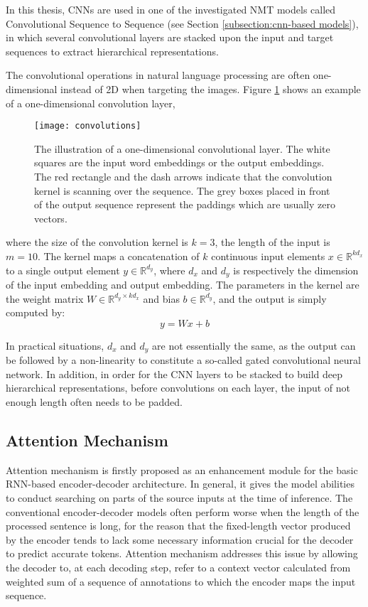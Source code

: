 In this thesis, CNNs are used in one of the investigated NMT models called Convolutional Sequence to Sequence (see Section \ref{subsection:cnn-based models}), in which several convolutional layers are stacked upon the input and target sequences to extract hierarchical representations.

The convolutional operations in natural language processing are often one-dimensional instead of 2D when targeting the images. Figure \ref{figure:convolutions} shows an example of a one-dimensional convolution layer, 
\begin{figure}[h]
\texttt{[image: convolutions]}
\centering
\caption{The illustration of a one-dimensional convolutional layer. The white squares are the input word embeddings or the output embeddings. The red rectangle and the dash arrows indicate that the convolution kernel is scanning over the sequence. The grey boxes placed in front of the output sequence represent the paddings which are usually zero vectors.}
\label{figure:convolutions}
\end{figure}
where the size of the convolution kernel is $ k=3 $, the length of the input is $ m=10 $. The kernel maps a concatenation of $ k $ continuous input elements $ x\in \mathbb{R}^{kd_{x}} $ to a single output element $ y \in \mathbb{R}^{d_{y}} $, where $ d_{x} $ and $ d_{y} $ is respectively the dimension of the input embedding and output embedding. The parameters in the kernel are the weight matrix $ W \in \mathbb{R}^{d_{y} \times kd_{x}} $ and bias $ b \in \mathbb{R}^{d_{y}} $, and the output is simply computed by:
\[ y = Wx + b \]

In practical situations, $ d_{x} $ and $ d_{y} $ are not essentially the same, as the output can be followed by a non-linearity to constitute a so-called gated convolutional neural network. In addition, in order for the CNN layers to be stacked to build deep hierarchical representations, before convolutions on each layer, the input of not enough length often needs to be padded.

\subsection{Attention Mechanism} \label{subsection:attention}

Attention mechanism \cite{Bahdanau2014} is firstly proposed as an enhancement module for the basic RNN-based encoder-decoder architecture. In general, it gives the model abilities to conduct searching on parts of the source inputs at the time of inference. The conventional encoder-decoder models often perform worse when the length of the processed sentence is long, for the reason that the fixed-length vector produced by the encoder tends to lack some necessary information crucial for the decoder to predict accurate tokens. Attention mechanism addresses this issue by allowing the decoder to, at each decoding step, refer to a context vector calculated from weighted sum of a sequence of annotations to which the encoder maps the input sequence.

